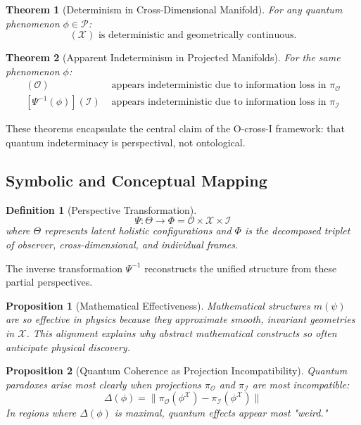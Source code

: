 \documentclass{article}
\newtheorem{definition}{Definition}
\newtheorem{theorem}{Theorem}
\newtheorem{proposition}{Proposition}
\begin{document}
\begin{theorem}[Determinism in Cross-Dimensional Manifold]
For any quantum phenomenon $\phi \in \mathcal{P}$:
\begin{equation}
[\Psi^{-1}(\phi)](\mathcal{X}) \text{ is deterministic and geometrically continuous.}
\end{equation}
\end{theorem}

\begin{theorem}[Apparent Indeterminism in Projected Manifolds]
For the same phenomenon $\phi$:
\begin{align}
[\Psi^{-1}(\phi)](\mathcal{O}) &\text{ appears indeterministic due to information loss in } \pi_{\mathcal{O}} \\
[\Psi^{-1}(\phi)](\mathcal{I}) &\text{ appears indeterministic due to information loss in } \pi_{\mathcal{I}}
\end{align}
\end{theorem}

These theorems encapsulate the central claim of the O-cross-I framework: that quantum indeterminacy is perspectival, not ontological.

\subsection{Symbolic and Conceptual Mapping}

\begin{definition}[Perspective Transformation]
\begin{equation}
\Psi : \Theta \to \Phi = \mathcal{O} \times \mathcal{X} \times \mathcal{I}
\end{equation}
where $\Theta$ represents latent holistic configurations and $\Phi$ is the decomposed triplet of observer, cross-dimensional, and individual frames.
\end{definition}

The inverse transformation $\Psi^{-1}$ reconstructs the unified structure from these partial perspectives.

\begin{proposition}[Mathematical Effectiveness]
Mathematical structures $m(\psi)$ are so effective in physics because they approximate smooth, invariant geometries in $\mathcal{X}$. This alignment explains why abstract mathematical constructs so often anticipate physical discovery.
\end{proposition}

\begin{proposition}[Quantum Coherence as Projection Incompatibility]
Quantum paradoxes arise most clearly when projections $\pi_{\mathcal{O}}$ and $\pi_{\mathcal{I}}$ are most incompatible:
\begin{equation}
\Delta(\phi) = \| \pi_{\mathcal{O}}(\phi^{\mathcal{X}}) - \pi_{\mathcal{I}}(\phi^{\mathcal{X}}) \|
\end{equation}
In regions where $\Delta(\phi)$ is maximal, quantum effects appear most "weird."
\end{proposition}
\end{document}

